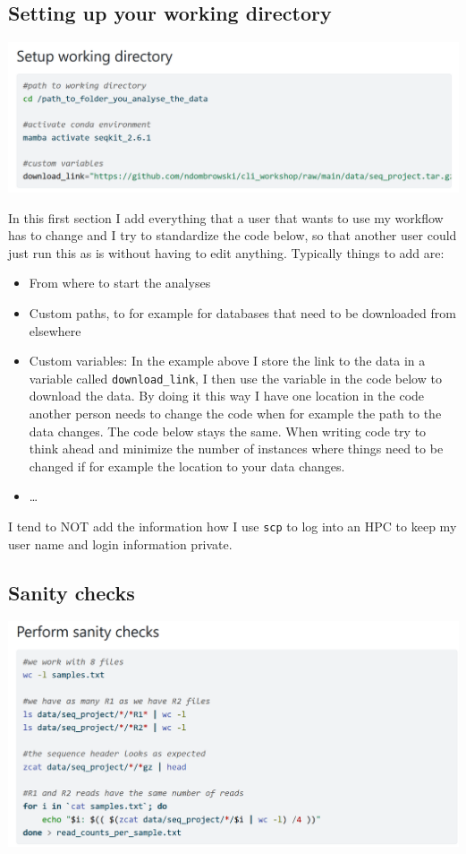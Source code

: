 \documentclass[
  letterpaper,
  DIV=11,
  numbers=noendperiod]{scrreprt}
\providecommand{\tightlist}{%
  \setlength{\itemsep}{0pt}\setlength{\parskip}{0pt}}\usepackage{longtable,booktabs,array}
\begin{document}
\subsection{Setting up your working
directory}\label{setting-up-your-working-directory}

\includegraphics[width=5.71875in,height=\textheight]{../img/general_setup.png}

In this first section I add everything that a user that wants to use my
workflow has to change and I try to standardize the code below, so that
another user could just run this as is without having to edit anything.
Typically things to add are:

\begin{itemize}
\tightlist
\item
  From where to start the analyses
\item
  Custom paths, to for example for databases that need to be downloaded
  from elsewhere
\item
  Custom variables: In the example above I store the link to the data in
  a variable called \texttt{download\_link}, I then use the variable in
  the code below to download the data. By doing it this way I have one
  location in the code another person needs to change the code when for
  example the path to the data changes. The code below stays the same.
  When writing code try to think ahead and minimize the number of
  instances where things need to be changed if for example the location
  to your data changes.
\item
  \ldots{}
\end{itemize}

I tend to NOT add the information how I use \texttt{scp} to log into an
HPC to keep my user name and login information private.

\subsection{Sanity checks}\label{sanity-checks}

\includegraphics[width=5.84375in,height=\textheight]{../img/sanity_check.png}
\end{document}
